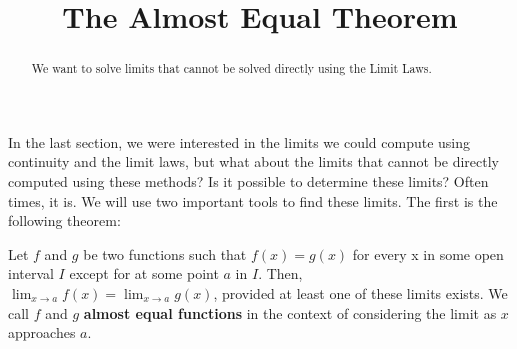 \documentclass{ximera}
\title{The Almost Equal Theorem}
\begin{document}
\begin{abstract}
  We want to solve limits that cannot be solved directly using the
  Limit Laws.
\end{abstract}

\maketitle


In the last section, we were interested in the limits we could compute
using continuity and the limit laws, but what about the limits that
cannot be directly computed using these methods?  Is it possible to
determine these limits?  Often times, it is.  We will use two
important tools to find these limits.  The first is the following
theorem:

\begin{theorem}
Let $f$ and $g$ be two functions such that $f(x)=g(x)$ for every x in
some open interval $I$ except for at some point $a$ in $I$.  Then,
$\lim_{x\to a} f(x)= \lim_{x\to a} g(x)$, provided at least one of
these limits exists.  We call $f$ and $g$ \textbf{almost equal
  functions} in the context of considering the limit as $x$ approaches
$a$.
\end{theorem}
\end{document}
